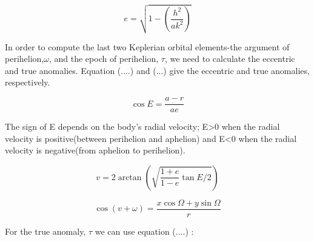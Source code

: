 \documentclass[letterpaper,12pt]{article}
\begin{document}
\begin{equation}
e=\sqrt{1-(\frac{h^2}{ak^2})}
\end{equation}

In order to compute the last two Keplerian orbital elements-the argument of perihelion,\begin{math} \omega \end{math}, and the epoch of perihelion, \begin{math} \tau \end{math}, we need to calculate the eccentric and true anomalies. Equation (....) and (...) give the eccentric and true anomalies, respectively.

\begin{equation}
\cos E = \frac{a-r}{ae}
\end{equation}

The sign of E depends on the body's radial velocity; E>0 when the radial velocity is positive(between perihelion and aphelion) and E<0 when the radial velocity is negative(from aphelion to perihelion).

\begin{equation}
v = 2\arctan(\sqrt{\frac{1+e}{1-e}\tan E/2})
\end{equation}

\begin{equation}
\cos (v+\omega) = \frac{x \cos \Omega + y \sin \Omega}{r} 
\end{equation}


For the true anomaly, \begin{math} \tau \end{math} we can use equation (....) :
\end{document}
